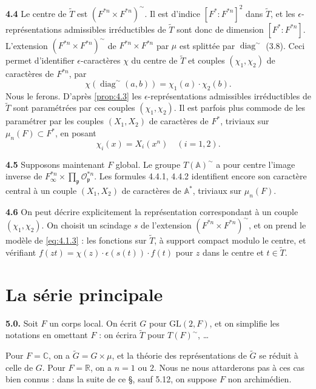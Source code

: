 \documentclass[12pt,a4paper]{article}
\theoremstyle{plain}
\theoremstyle{definition}
\theoremstyle{remark}
\DeclareMathOperator{\diag}{diag}
\newcommand{\CC}{\mathbb{C}}
\newcommand{\RR}{\mathbb{R}}
\newcommand{\Af}{\mathbb{A}}
\newcommand{\cO}{\mathcal{O}}
\newcommand{\frakp}{\mathfrak{p}}
\newcommand{\wt}{\widetilde}
\providecommand{\CC}{\mathbb{C}}
\providecommand{\RR}{\mathbb{R}}
\providecommand{\cO}{\mathcal{O}}
\providecommand{\frakp}{\mathfrak{p}}
\begin{document}
\textbf{4.4} Le centre de $\wt{T}$ est $(F^{*n} \times F^{*n})^\sim$. Il est d'indice $[F^* : F^{*n}]^2$ dans $\wt{T}$, et les $\epsilon$-représentations admissibles irréductibles de $\wt{T}$ sont donc de dimension $[F^* : F^{*n}]$. L'extension $(F^{*n} \times F^{*n})^\sim$ de $F^{*n} \times F^{*n}$ par $\mu$ est splittée par $\diag^\sim$ (3.8). Ceci permet d'identifier $\epsilon$-caractères $\chi$ du centre de $\wt{T}$ et couples $(\chi_1, \chi_2)$ de caractères de $F^{*n}$, par
\begin{equation}\label{eq:4.4.1}
\chi(\diag^\sim(a, b)) = \chi_1(a) \cdot \chi_2(b).
\tag{4.4.1}
\end{equation}
Nous le ferons. D'après \ref{prop:4.3} les $\epsilon$-représentations admissibles irréductibles de $\wt{T}$ sont paramétrées par ces couples $(\chi_1, \chi_2)$. Il est parfois plus commode de les paramétrer par les couples $(X_1, X_2)$ de caractères de $F^*$, triviaux sur $\mu_n(F) \subset F^*$, en posant
\begin{equation}\label{eq:4.4.2}
\chi_i(x) = X_i(x^n) \quad (i = 1, 2).
\tag{4.4.2}
\end{equation}

\textbf{4.5} Supposons maintenant $F$ global. Le groupe $T(\Af)^\sim$ a pour centre l'image inverse de $F_\infty^{*n} \times \prod_\frakp \cO_\frakp^{*n}$. Les formules 4.4.1, 4.4.2 identifient encore son caractère central à un couple $(X_1, X_2)$ de caractères de $\Af^*$, triviaux sur $\mu_n(F)$.

\textbf{4.6} On peut décrire explicitement la représentation correspondant à un couple $(\chi_1, \chi_2)$. On choisit un scindage $s$ de l'extension $(F^{*n} \times F^{*n})^\sim$, et on prend le modèle de \eqref{eq:4.1.3} : les fonctions sur $\wt{T}$, à support compact modulo le centre, et vérifiant $f(zt) = \chi(z) \cdot \epsilon(s(t)) \cdot f(t)$ pour $z$ dans le centre et $t \in \wt{T}$.


\section{La série principale}

\textbf{5.0.} Soit $F$ un corps local. On écrit $G$ pour $\mathrm{GL}(2, F)$, et on simplifie les notations en omettant $F$ : on écrira $\wt{T}$ pour $T(F)^\sim$, \ldots

Pour $F = \CC$, on a $\wt{G} = G \times \mu$, et la théorie des représentations de $\wt{G}$ se réduit à celle de $G$. Pour $F = \RR$, on a $n = 1$ ou $2$. Nous ne nous attarderons pas à ces cas bien connus : dans la suite de ce \S, sauf 5.12, on suppose $F$ non archimédien.
\end{document}
